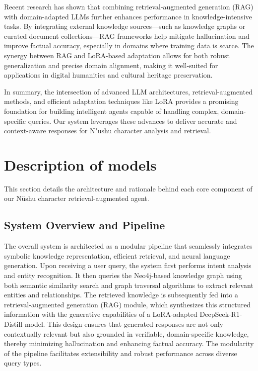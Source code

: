 \documentclass{article}
\begin{document}
    Recent research has shown that combining retrieval-augmented generation (RAG) with domain-adapted LLMs further enhances performance in knowledge-intensive tasks. By integrating external knowledge sources—such as knowledge graphs or curated document collections—RAG frameworks help mitigate hallucination and improve factual accuracy, especially in domains where training data is scarce. The synergy between RAG and LoRA-based adaptation allows for both robust generalization and precise domain alignment, making it well-suited for applications in digital humanities and cultural heritage preservation.

    In summary, the intersection of advanced LLM architectures, retrieval-augmented methods, and efficient adaptation techniques like LoRA provides a promising foundation for building intelligent agents capable of handling complex, domain-specific queries. Our system leverages these advances to deliver accurate and context-aware responses for N"{u}shu character analysis and retrieval.

\section{Description of models}
\label{sec:models}
    This section details the architecture and rationale behind each core component of our N\"{u}shu character retrieval-augmented agent. 
    
\subsection{System Overview and Pipeline}
\label{ssec:system_overview}
    The overall system is architected as a modular pipeline that seamlessly integrates symbolic knowledge representation, efficient retrieval, and neural language generation. Upon receiving a user query, the system first performs intent analysis and entity recognition. It then queries the Neo4j-based knowledge graph using both semantic similarity search and graph traversal algorithms to extract relevant entities and relationships. The retrieved knowledge is subsequently fed into a retrieval-augmented generation (RAG) module, which synthesizes this structured information with the generative capabilities of a LoRA-adapted DeepSeek-R1-Distill model. This design ensures that generated responses are not only contextually relevant but also grounded in verifiable, domain-specific knowledge, thereby minimizing hallucination and enhancing factual accuracy. The modularity of the pipeline facilitates extensibility and robust performance across diverse query types.
\end{document}
